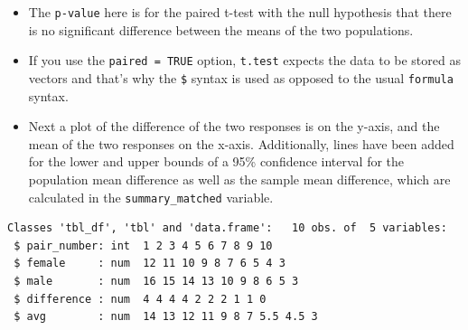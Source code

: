 \documentclass[twoside, 12pt]{article}
\newenvironment{Shaded}{\begin{snugshade}}{\end{snugshade}}
\newcommand{\KeywordTok}[1]{\textcolor[rgb]{0.13,0.29,0.53}{\textbf{{#1}}}}
\newcommand{\DataTypeTok}[1]{\textcolor[rgb]{0.13,0.29,0.53}{{#1}}}
\newcommand{\DecValTok}[1]{\textcolor[rgb]{0.00,0.00,0.81}{{#1}}}
\newcommand{\FloatTok}[1]{\textcolor[rgb]{0.00,0.00,0.81}{{#1}}}
\newcommand{\StringTok}[1]{\textcolor[rgb]{0.31,0.60,0.02}{{#1}}}
\newcommand{\NormalTok}[1]{{#1}}
\begin{document}
\begin{itemize}
\item
  The \texttt{p-value} here is for the paired t-test with the null
  hypothesis that there is no significant difference between the means
  of the two populations.
\item
  If you use the \texttt{paired\ =\ TRUE} option, \texttt{t.test}
  expects the data to be stored as vectors and that's why the
  \texttt{\$} syntax is used as opposed to the usual \texttt{formula}
  syntax.
\item
  Next a plot of the difference of the two responses is on the y-axis,
  and the mean of the two responses on the x-axis. Additionally, lines
  have been added for the lower and upper bounds of a 95\% confidence
  interval for the population mean difference as well as the sample mean
  difference, which are calculated in the \texttt{summary\_matched}
  variable.
\end{itemize}

\begin{Shaded}
\end{Shaded}

\begin{Verbatim}[frame=single]
Classes 'tbl_df', 'tbl' and 'data.frame':   10 obs. of  5 variables:
 $ pair_number: int  1 2 3 4 5 6 7 8 9 10
 $ female     : num  12 11 10 9 8 7 6 5 4 3
 $ male       : num  16 15 14 13 10 9 8 6 5 3
 $ difference : num  4 4 4 4 2 2 2 1 1 0
 $ avg        : num  14 13 12 11 9 8 7 5.5 4.5 3
\end{Verbatim}

\begin{Shaded}
\end{Shaded}
\end{document}
